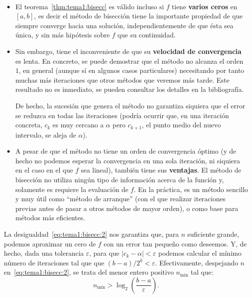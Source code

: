 \begin{remark}
  \label{rk:tema1:unicidad-bisecc}
  ~
  \begin{itemize}
  \item El teorema~\ref{thm:tema1:bisecc} es válido incluso si $f$
    tiene \textbf{varios ceros} en $[a,b]$, es decir el método de
    bisección tiene la importante propiedad de que siempre converge
    hacia una solución, independientemente de que ésta sea única, y
    sin más hipótesis sobre $f$ que su continuidad.
  \item Sin embargo, tiene el inconveniente de que su
    \textbf{velocidad de convergencia} es lenta. En concreto, se puede
    demostrar que el método no alcanza el orden $1$, en general
    (aunque sí en algunos casos particulares) necesitando por tanto
    muchas más iteraciones que otros métodos que veremos más tarde.
    Este resultado no es inmediato, se pueden consultar los detalles
    en la bibliografía.

    De hecho, la sucesión que genera el método no garantiza siquiera
    que el error se reduzca en todas las iteraciones (podría ocurrir
    que, en una iteración concreta, $c_k$ es muy cercano a $\alpha$
    pero $c_{k+1}$, el punto medio del nuevo intervalo, se aleja de
    $\alpha$).


  \item A pesar de que el método no tiene un orden de convergencia
    óptimo (y de hecho no podemos esperar la convergencia en una sola
    iteración, ni siquiera en el caso en el que $f$ sea lineal),
    también tiene sus \textbf{ventajas}. El método de bisección no utiliza
    ningún tipo de información acerca de la función y, solamente es
    requiere la evaluación de $f$. En la práctica, es un método
    sencillo y muy útil como ``método de arranque'' (con el que
    realizar iteraciones previas antes de pasar a otros métodos de
    mayor orden), o como base para métodos más eficientes.
  \end{itemize}
\end{remark}

\begin{remark}
  \label{rk:tema1:bisecc:iteraciones}
  La desigualdad~\eqref{eq:tema1:bisecc:2} nos garantiza que, para $n$
  suficiente grande, podemos aproximar un cero de $f$ con un error tan
  pequeño como deseemos. Y, de hecho, dada una tolerancia $\varepsilon$,
  para que $|c_k-\alpha|<\varepsilon$ podemos calcular el mínimo número
  de iteraciones tal que que $(b-a)/2^k < \varepsilon$. Efectivamente,
  despejando $n$ en~\eqref{eq:tema1:bisecc:2}, se trata del menor
  entero positivo $n_{\text{mín}}$ tal que:
  \begin{equation*}
    n_{\text{mín}}>\log_2\left(\frac{b-a}{\varepsilon}\right).
  \end{equation*}
\end{remark}

